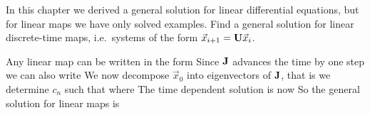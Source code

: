In this chapter we derived a general solution for linear differential equations, but for linear maps we have only solved examples. Find a general solution for linear discrete-time maps, 
i.e.~systems of the form $\vec{x}_{i+1}={\bf U}\vec{x}_i$.

\solution

Any linear map can be written in the form 
Since $\bf J$ advances the time by one step we can also write 
We now decompose $\vec{x}_0$ into eigenvectors of $\bf J$, that is we determine $c_n$ such that  
where 
The time dependent solution is now 
So the general solution for linear maps is 
